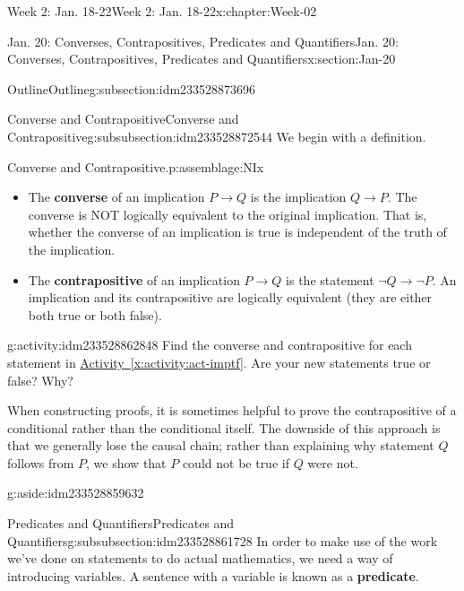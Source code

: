 \documentclass[oneside,10pt,]{book}
\newcommand{\xreffont}{\relax}
\newcommand{\terminology}[1]{\textbf{#1}}
\numberwithin{equation}{section}
\def\imp{\to}
\newcommand{\imp}{\rightarrow}
\begin{document}
\begin{chapterptx}{Week 2: Jan. 18-22}{}{Week 2: Jan. 18-22}{}{}{x:chapter:Week-02}
\begin{sectionptx}{Jan. 20: Converses, Contrapositives, Predicates and Quantifiers}{}{Jan. 20: Converses, Contrapositives, Predicates and Quantifiers}{}{}{x:section:Jan-20}
\begin{subsectionptx}{Outline}{}{Outline}{}{}{g:subsection:idm233528873696}
%
%
\typeout{************************************************}
\typeout{************************************************}
%
\begin{subsubsectionptx}{Converse and Contrapositive}{}{Converse and Contrapositive}{}{}{g:subsubsection:idm233528872544}
We begin with a definition.%
\begin{assemblage}{Converse and Contrapositive.}{p:assemblage:NIx}%
%
\begin{itemize}[label=\textbullet]
\item{}The \terminology{converse}  of an implication \(P \imp Q\) is the implication \(Q \imp P\). The converse is NOT logically equivalent to the original implication. That is, whether the converse of an implication is true is independent of the truth of the implication.%
\item{}The \terminology{contrapositive}  of an implication \(P \imp Q\) is the statement \(\neg Q \imp \neg P\). An implication and its contrapositive are logically equivalent (they are either both true or both false).%
\end{itemize}
%
\end{assemblage}
\begin{activity}{}{g:activity:idm233528862848}%
Find the converse and contrapositive for each statement in \hyperref[x:activity:act-imptf]{Activity~{\xreffont\ref{x:activity:act-imptf}}}. Are your new statements true or false? Why?%
\end{activity}%
When constructing proofs, it is sometimes helpful to prove the contrapositive of a conditional rather than the conditional itself. The downside of this approach is that we generally lose the causal chain; rather than explaining why statement \(Q\) follows from \(P\), we show that \(P\) could not be true if \(Q\) were not. \begin{aside}{}{g:aside:idm233528859632}%
\end{aside}
%
\end{subsubsectionptx}
%
%
\typeout{************************************************}
\typeout{************************************************}
%
\begin{subsubsectionptx}{Predicates and Quantifiers}{}{Predicates and Quantifiers}{}{}{g:subsubsection:idm233528861728}
In order to make use of the work we've done on statements to do actual mathematics, we need a way of introducing variables. A sentence with a variable is known as a \terminology{predicate}.%

\end{subsubsectionptx}
\end{subsectionptx}
\end{sectionptx}
\end{chapterptx}
\end{document}
